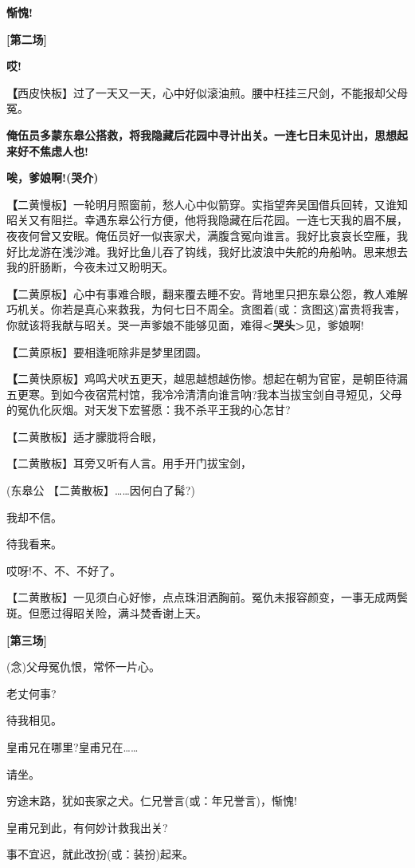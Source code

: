 \textbf{惭愧!}

\textbf{{[}第二场{]}}

\textbf{哎!}

\textbf{【}西皮快板】过了一天又一天，心中好似滚油煎。腰中枉挂三尺剑，不能报却父母冤。

\textbf{俺伍员多蒙东皋公搭救，将我隐藏后花园中寻计出关。一连七日未见计出，思想起来好不焦虑人也!}

\textbf{唉，爹娘啊!(哭介)}

\textbf{【}二黄慢板】一轮明月照窗前，愁人心中似箭穿。实指望奔吴国借兵回转，又谁知昭关又有阻拦。幸遇东皋公行方便，他将我隐藏在后花园。一连七天我的眉不展，夜夜何曾又安眠。俺伍员好一似丧家犬，满腹含冤向谁言。我好比哀哀长空雁，我好比龙游在浅沙滩。我好比鱼儿吞了钩线，我好比波浪中失舵的舟船呐。思来想去我的肝肠断，今夜未过又盼明天。

\textbf{【}二黄原板】心中有事难合眼，翻来覆去睡不安。背地里只把东皋公怨，教人难解巧机关。你若是真心来救我，为何七日不周全。贪图着(或：贪图这)富贵将我害，你就该将我献与昭关。哭一声爹娘不能够见面，难得\textbf{\textless{}哭头\textgreater{}}见，爹娘啊!

\textbf{【}二黄原板】要相逢呃除非是梦里团圆。

\textbf{【}二黄快原板】鸡鸣犬吠五更天，越思越想越伤惨。想起在朝为官宦，是朝臣待漏五更寒。到如今夜宿荒村馆，我冷冷清清向谁言呐?我本当拔宝剑自寻短见，父母的冤仇化灰烟。对天发下宏誓愿：我不杀平王我的心怎甘?

【二黄散板】适才朦胧将合眼，

【二黄散板】耳旁又听有人言。用手开门拔宝剑，

(东皋公 【二黄散板】\ldots{}\ldots{}因何白了髯?)

我却不信。

待我看来。

哎呀!不、不、不好了。

【二黄散板】一见须白心好惨，点点珠泪洒胸前。冤仇未报容颜变，一事无成两鬓斑。但愿过得昭关险，满斗焚香谢上天。

\textbf{{[}第三场{]}}

(念)父母冤仇恨，常怀一片心。

老丈何事?

待我相见。

皇甫兄在哪里?皇甫兄在\ldots{}\ldots{}

请坐。

穷途末路，犹如丧家之犬。仁兄誉言(或：年兄誉言)，惭愧!

皇甫兄到此，有何妙计救我出关?

事不宜迟，就此改扮(或：装扮)起来。

